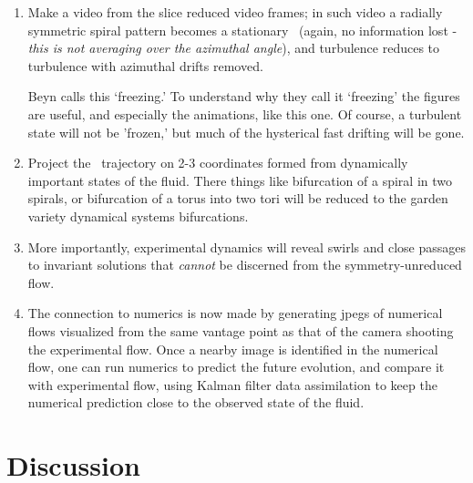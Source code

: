 \begin{enumerate}
\item Make a video from the slice reduced video frames; in such video a
radially symmetric spiral pattern becomes a stationary \reqv\ (again, no
information lost - \emph{this is not averaging over the azimuthal
angle}), and turbulence reduces to turbulence with azimuthal drifts
removed.

Beyn calls this `freezing.' To understand why they call it
`freezing' the figures are useful, and especially the animations, like
{this one}. Of course, a turbulent state will not be 'frozen,' but much
of the hysterical fast drifting will be gone.

    \item Project the \statesp\ trajectory on 2-3 coordinates formed from
dynamically important states of the fluid. There things like
bifurcation of a spiral in two spirals, or bifurcation of a torus into
two tori will be reduced to the garden variety dynamical systems
bifurcations.

    \item More importantly, experimental dynamics will reveal swirls and
close passages to invariant solutions that \emph{cannot} be discerned from the
symmetry-unreduced flow.

    \item The connection to numerics is now made by generating jpegs of
numerical flows visualized from the same vantage point as that of the camera
shooting the experimental flow. Once a nearby image is identified in the
numerical flow, one can run numerics to predict the future evolution, and
compare it with experimental flow, using Kalman filter data assimilation
to keep the numerical prediction close to the observed state of the
fluid.
\end{enumerate}

\section{Discussion}

